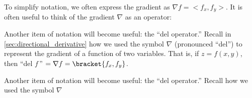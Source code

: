 

\usepackage{headers/apex_style}



\newcommand{\forwhom}{}

\printallanswers
\printincolor
\usethreeDgraphics




%

\mainmatter

\pagestyle{fancy}

To simplify notation, we often express the gradient as $\nabla f =<f_x, f_y>$. It is often useful to think of the gradient $\nabla$ as an operator:

\cleardoublepage

Another item of notation will become useful: the ``del operator.'' Recall in \autoref{sec:directional_derivative} how we used the symbol $\nabla$ (pronounced ``del'') to represent the gradient of a function of two variables. That is, if $z = f(x,y)$, then ``del $f$\,'' $= \nabla f =\bracket{f_x, f_y}$.

\cleardoublepage

Another item of notation will become useful: the ``del operator.'' Recall how we used the symbol $\nabla$

\cleardoublepage


%
%
\setcounter{chapter}{14}
\setcounter{section}{1}


\clearpage

\apexappendix


\pagestyle{empty}
\eendgeometry

\cleardoublepage
{}
{}
\printindex

%
%


